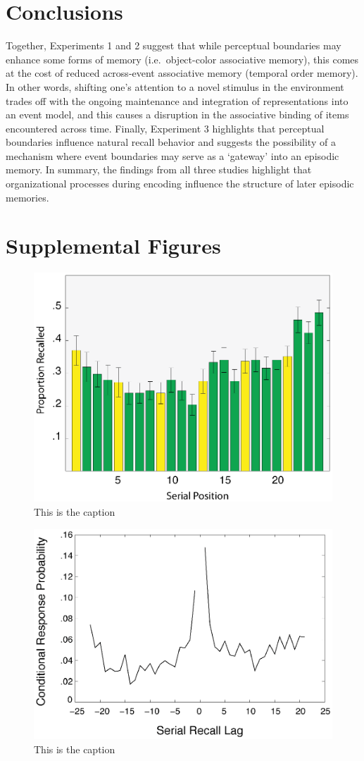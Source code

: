 \section{Conclusions}\label{conclusions}

Together, Experiments 1 and 2 suggest that while perceptual boundaries
may enhance some forms of memory (i.e.~object-color associative memory),
this comes at the cost of reduced across-event associative memory
(temporal order memory). In other words, shifting one's attention to a
novel stimulus in the environment trades off with the ongoing
maintenance and integration of representations into an event model, and
this causes a disruption in the associative binding of items encountered
across time. Finally, Experiment 3 highlights that perceptual boundaries
influence natural recall behavior and suggests the possibility of a
mechanism where event boundaries may serve as a `gateway' into an
episodic memory. In summary, the findings from all three studies
highlight that organizational processes during encoding influence the
structure of later episodic memories.

\section{Supplemental Figures}\label{supplemental-figures}

\begin{figure}[htbp]
\centering
\includegraphics{figures/chapter1_suppfigure1}
\caption{This is the caption}
\end{figure}

\begin{figure}[htbp]
\centering
\includegraphics{figures/chapter1_suppfigure2}
\caption{This is the caption}
\end{figure}
